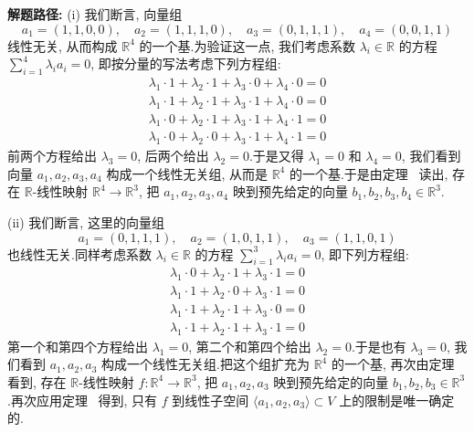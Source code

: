\noindent\textbf{解题路径:} (i) 我们断言, 向量组
\[
a_1 = (1, 1, 0, 0), \quad a_2 = (1, 1, 1, 0), \quad a_3 = (0, 1, 1, 1), \quad a_4 = (0, 0, 1, 1)
\]
线性无关, 从而构成 $\mathbb{R}^4$ 的一个基.为验证这一点, 我们考虑系数 $\lambda_i \in \mathbb{R}$ 的方程 $\sum_{i = 1}^{4} \lambda_i a_i = 0$, 即按分量的写法考虑下列方程组:
\[
\begin{array}{l}
\lambda_1 \cdot 1 + \lambda_2 \cdot 1 + \lambda_3 \cdot 0 + \lambda_4 \cdot 0 = 0\\
\lambda_1 \cdot 1 + \lambda_2 \cdot 1 + \lambda_3 \cdot 1 + \lambda_4 \cdot 0 = 0\\
\lambda_1 \cdot 0 + \lambda_2 \cdot 1 + \lambda_3 \cdot 1 + \lambda_4 \cdot 1 = 0\\
\lambda_1 \cdot 0 + \lambda_2 \cdot 0 + \lambda_3 \cdot 1 + \lambda_4 \cdot 1 = 0
\end{array}
\]
前两个方程给出 $\lambda_3 = 0$, 后两个给出 $\lambda_2 = 0$.于是又得 $\lambda_1 = 0$ 和 $\lambda_4 = 0$, 我们看到向量 $a_1, a_2, a_3, a_4$ 构成一个线性无关组, 从而是 $\mathbb{R}^4$ 的一个基.于是由定理~ 读出, 存在 $\mathbb{R}$-线性映射 $\mathbb{R}^4 \longrightarrow \mathbb{R}^3$, 把 $a_1, a_2, a_3, a_4$ 映到预先给定的向量 $b_1, b_2, b_3, b_4 \in \mathbb{R}^3$.

(ii) 我们断言, 这里的向量组
\[
a_1 = (0, 1, 1, 1), \quad a_2 = (1, 0, 1, 1), \quad a_3 = (1, 1, 0, 1)
\]
也线性无关.同样考虑系数 $\lambda_i \in \mathbb{R}$ 的方程 $\sum_{i = 1}^{3} \lambda_i a_i = 0$, 即下列方程组:
\[
\begin{array}{l}
\lambda_1 \cdot 0 + \lambda_2 \cdot 1 + \lambda_3 \cdot 1 = 0\\
\lambda_1 \cdot 1 + \lambda_2 \cdot 0 + \lambda_3 \cdot 1 = 0\\
\lambda_1 \cdot 1 + \lambda_2 \cdot 1 + \lambda_3 \cdot 0 = 0\\
\lambda_1 \cdot 1 + \lambda_2 \cdot 1 + \lambda_3 \cdot 1 = 0
\end{array}
\]
第一个和第四个方程给出 $\lambda_1 = 0$, 第二个和第四个给出 $\lambda_2 = 0$.于是也有 $\lambda_3 = 0$, 我们看到 $a_1, a_2, a_3$ 构成一个线性无关组.把这个组扩充为 $\mathbb{R}^4$ 的一个基, 再次由定理~ 看到, 存在 $\mathbb{R}$-线性映射 $f \colon \mathbb{R}^4 \longrightarrow \mathbb{R}^3$, 把 $a_1, a_2, a_3$ 映到预先给定的向量 $b_1, b_2, b_3 \in \mathbb{R}^3$.再次应用定理~ 得到, 只有 $f$ 到线性子空间 $\langle a_1, a_2, a_3 \rangle \subset V$ 上的限制是唯一确定的.


